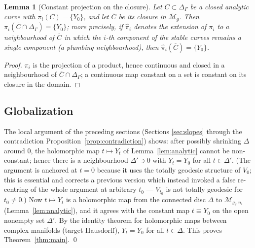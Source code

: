 \documentclass[11pt]{article}
\newcommand{\M}{\mathcal{M}}
\newtheorem{lem}[thm]{Lemma}
\theoremstyle{definition}
\theoremstyle{remark}
\begin{document}
\begin{lem}[Constant projection on the closure]\label{lem:constclosure}
Let $C \subset \Delta_\Gamma$ be a closed analytic curve with
$\pi_i(C) = \{Y_0\}$, and let $\overline{C}$ be its closure in
$\overline{\M}_g$. Then $\pi_i(\overline{C} \cap \Delta_\Gamma)
= \{Y_0\}$; more precisely, if
$\hat \pi_i$ denotes the extension of $\pi_i$ to a neighbourhood of
$\overline{C}$ in which the $i$-th component of the stable curves remains
a single component (a plumbing neighbourhood), then
$\hat\pi_i(\overline{C}) = \{Y_0\}$.
\end{lem}

\begin{proof}
$\pi_i$ is the projection of a product, hence continuous and closed in a
neighbourhood of $\overline{C} \cap \Delta_\Gamma$; a continuous map
constant on a set is constant on its closure in the domain.
\end{proof}

\subsection{Globalization}

The local argument of the preceding sections (Sections
\ref{sec:slopes} through the contradiction
Proposition~\ref{prop:contradiction}) shows: after possibly shrinking
$\Delta$ around $0$, the holomorphic map $t \mapsto Y_t$ of
Lemma~\ref{lem:analytic} cannot be non-constant; hence there is a
neighbourhood $\Delta' \ni 0$ with $Y_t = Y_0$ for all $t \in \Delta'$.
(The argument is anchored at $t = 0$ because it uses the totally
geodesic structure of $V_0$; this is essential and corrects a previous
version which instead invoked a false re-centring of the whole argument
at arbitrary $t_0$ --- $V_{t_0}$ is not totally geodesic for $t_0 \ne
0$.)
Now $t \mapsto Y_t$ is a holomorphic map from the connected disc
$\Delta$ to $\M_{g_i,n_i}$ (Lemma~\ref{lem:analytic}), and it agrees
with the constant map $t \equiv Y_0$ on the open nonempty set
$\Delta'$. By the identity theorem for holomorphic maps between complex
manifolds (target Hausdorff), $Y_t = Y_0$ for all $t \in \Delta$. This
proves Theorem~\ref{thm:main}. \qed
\end{document}
